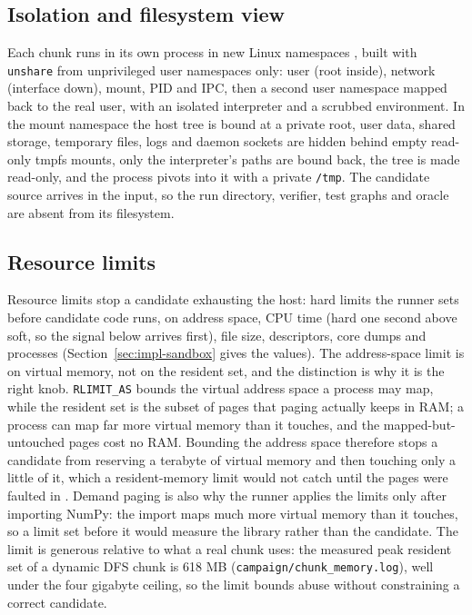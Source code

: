 \subsection{Isolation and filesystem view}

Each chunk runs in its own process in new Linux namespaces
\citep{manNamespaces,silberschatz2018os,tanenbaum2015modern}, built with
\texttt{unshare} from unprivileged user namespaces only: user (root inside),
network (interface down), mount, PID and IPC, then a second user namespace mapped
back to the real user, with an isolated interpreter and a scrubbed environment.
In the mount namespace the host tree is bound at a private root, user data,
shared storage, temporary files, logs and daemon sockets are hidden behind empty
read-only tmpfs mounts, only the interpreter's paths are bound back, the tree is
made read-only, and the process pivots into it with a private \texttt{/tmp}. The
candidate source arrives in the input, so the run directory, verifier, test graphs
and oracle are absent from its filesystem.

\subsection{Resource limits}

Resource limits stop a candidate exhausting the host: hard limits the runner sets
before candidate code runs, on address space, CPU time (hard one second above
soft, so the signal below arrives first), file size, descriptors, core dumps and
processes (Section~\ref{sec:impl-sandbox} gives the values). The address-space limit is on virtual memory, not on the resident set, and the
distinction is why it is the right knob. \texttt{RLIMIT\_AS} bounds the virtual
address space a process may map, while the resident set is the subset of pages
that paging actually keeps in RAM; a process can map far more virtual memory than
it touches, and the mapped-but-untouched pages cost no RAM. Bounding the address
space therefore stops a candidate from reserving a terabyte of virtual memory and
then touching only a little of it, which a resident-memory limit would not catch
until the pages were faulted in \citep{silberschatz2018os}. Demand paging is
also why the runner applies the limits only after importing NumPy: the import
maps much more virtual memory than it touches, so a limit set before it would
measure the library rather than the candidate. The limit is generous
relative to what a real chunk uses: the measured peak resident set of a dynamic
DFS chunk is 618 MB (\texttt{campaign/chunk\_memory.log}), well under the four
gigabyte ceiling, so the limit bounds abuse without constraining a correct
candidate.

